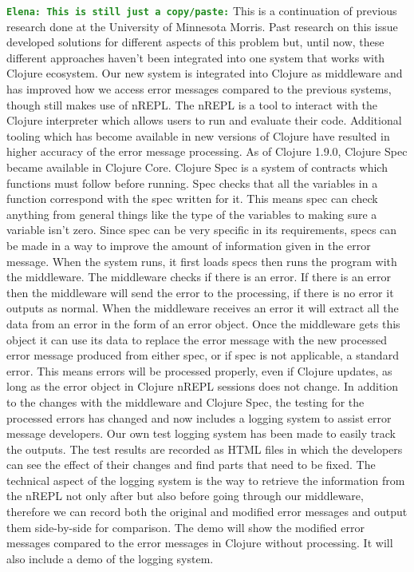 \documentclass[12pt]{article}
\newcommand{\comment}[1]{{\bf \tt  {#1}}}
\newcommand{\emcomment}[1]{\textcolor{ForestGreen}{\comment{Elena: {#1}}}}
\begin{document}
\emcomment{This is still just a copy/paste:}
This is a continuation of previous research done at the University of Minnesota Morris. Past research on this issue developed solutions for different aspects of this problem but, until now, these different approaches haven’t been integrated into one system that works with Clojure ecosystem. Our new system is integrated into Clojure as middleware and has improved how we access error messages compared to the previous systems, though still makes use of nREPL. The nREPL is a tool to interact with the Clojure interpreter which allows users to run and evaluate their code. Additional tooling which has become available in new versions of Clojure have resulted in higher accuracy of the error message processing. 
As of Clojure 1.9.0, Clojure Spec became available in Clojure Core. Clojure Spec is a system of contracts which functions must follow before running. Spec checks that all the variables in a function correspond with the spec written for it. This means spec can check anything from general things like the type of the variables to making sure a variable isn’t zero. Since spec can be very specific in its requirements, specs can be made in a way to improve the amount of information given in the error message. 
When the system runs, it first loads specs then runs the program with the middleware. The middleware checks if there is an error. If there is an error then the middleware will send the error to the processing, if there is no error it outputs as normal. When the middleware receives an error it will extract all the data from an error in the form of an error object. Once the middleware gets this object it can use its data to replace the error message with the new processed error message produced from either spec, or if spec is not applicable, a standard error. This means errors will be processed properly, even if Clojure updates, as long as the error object in Clojure nREPL sessions does not change.  
In addition to the changes with the middleware and Clojure Spec, the testing for the processed errors has changed and now includes a logging system to assist error message developers. Our own test logging system has been made to easily track the outputs. The test results are recorded as HTML files in which the developers can see the effect of their changes and find parts that need to be fixed. The technical aspect of the logging system is the way to retrieve the information from the nREPL not only after but also before going through our middleware, therefore we can record both the original and modified error messages and output them side-by-side for comparison.
The demo will show the modified error messages compared to the error messages in Clojure without processing. It will also include a demo of the logging system.
\end{document}
